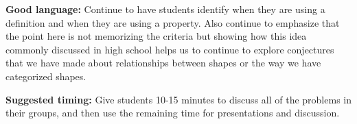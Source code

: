 \documentclass[nooutcomes,noauthor, handout]{ximera}
\begin{document}
\begin{instructorNotes}
\begin{itemize}
\end{itemize}




{\bf Good language:} Continue to have students identify when they are using a definition and when they are using a property. Also continue to emphasize that the point here is not memorizing the criteria but showing how this idea commonly discussed in high school helps us to continue to explore conjectures that we have made about relationships between shapes or the way we have categorized shapes.

{\bf Suggested timing:} Give students 10-15 minutes to discuss all of the problems in their groups, and then use the remaining time for presentations and discussion.


\end{instructorNotes}
\end{document}
